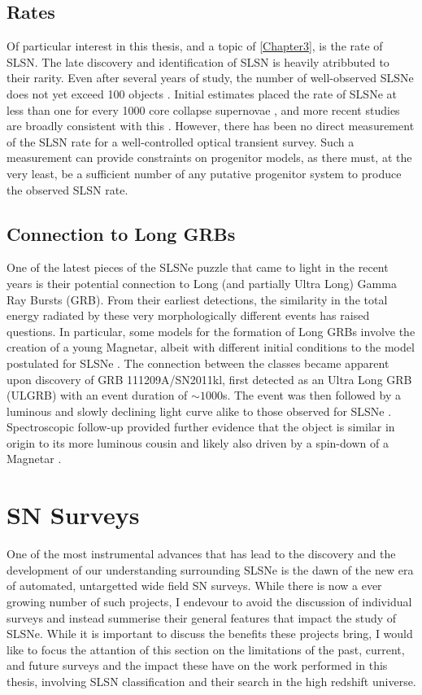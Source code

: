 \subsection{Rates}
Of particular interest in this thesis, and a topic of \cref{Chapter3}, is the rate of SLSN. The late discovery and identification of SLSN is heavily atribbuted to their rarity. Even after several years of study, the number of well-observed SLSNe does not yet exceed 100 objects \citep[e.g., see compilations in][]{Inserra2014,Papadopoulus2015,Nicholl2015,DeCia2018}. Initial estimates placed the rate of SLSNe at less than one for every 1000 core collapse supernovae \citep{Quimby2011}, and more recent studies are broadly consistent with this \citep{Quimby2013,McCrum2015}. However, there has been no direct measurement of the SLSN rate for a well-controlled optical transient survey. Such a measurement can provide constraints on progenitor models, as there must, at the very least, be a sufficient number of any putative progenitor system to produce the observed SLSN rate.

\subsection{Connection to Long GRBs}
One of the latest pieces of the SLSNe puzzle that came to light in the recent years is their potential connection to Long (and partially Ultra Long) Gamma Ray Bursts (GRB). From their earliest detections, the similarity in the total energy radiated by these very morphologically different events has raised questions. In particular, some models for the formation of Long GRBs involve the creation of a young Magnetar, albeit with different initial conditions to the model postulated for SLSNe \citep{Margalit2018}. The connection between the classes became apparent upon discovery of GRB 111209A/SN2011kl, first detected as an Ultra Long GRB (ULGRB) with an event duration of $\sim1000$s. The event was then followed by a luminous and slowly declining light curve alike to those observed for SLSNe \citep{Greiner2015}. Spectroscopic follow-up provided further evidence that the object is similar in origin to its more luminous cousin \citep{Mazzali2015} and likely also driven by a spin-down of a Magnetar \citep{Metzger2015}. 

\section{SN Surveys}
One of the most instrumental advances that has lead to the discovery and the development of our understanding surrounding SLSNe is the dawn of the new era of automated, untargetted wide field SN surveys. While there is now a ever growing number of such projects, I endevour to avoid the discussion of individual surveys and instead summerise their general features that impact the study of SLSNe. While it is important to discuss the benefits these projects bring, I would like to focus the attantion of this section on the limitations of the past, current, and future surveys and the impact these have on the work performed in this thesis, involving SLSN classification and their search in the high redshift universe.


